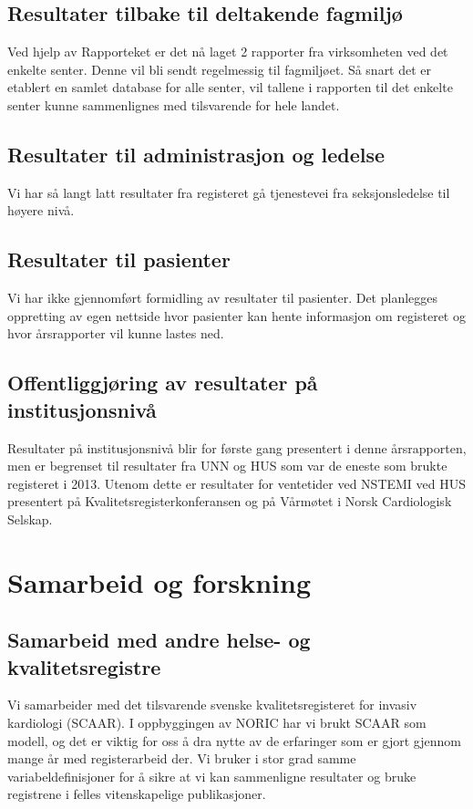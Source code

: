 \documentclass[norsk, a4paper]{report}
\begin{document}
\section{Resultater tilbake til deltakende fagmiljø}\label{sec:resfag}
Ved hjelp av Rapporteket er det nå laget 2 rapporter fra virksomheten ved det enkelte senter. Denne vil bli sendt regelmessig til fagmiljøet. Så snart det er etablert en samlet database for alle senter, vil tallene i rapporten til det enkelte senter kunne sammenlignes med tilsvarende for hele landet.

\section{Resultater til administrasjon og ledelse}\label{sec:resled}
Vi har så langt latt resultater fra registeret gå tjenestevei fra seksjonsledelse til høyere nivå.

\section{Resultater til pasienter}\label{sec:respas}
Vi har ikke gjennomført formidling av resultater til pasienter. Det planlegges oppretting av egen nettside hvor pasienter kan hente informasjon om registeret og hvor årsrapporter vil kunne lastes ned.

\section{Offentliggjøring av resultater på institusjonsnivå}\label{sec:off}
Resultater på institusjonsnivå blir for første gang presentert i denne årsrapporten, men er begrenset til resultater fra UNN og HUS som var de eneste som brukte registeret i 2013. Utenom dette er resultater for ventetider ved NSTEMI ved HUS presentert på Kvalitetsregisterkonferansen og på Vårmøtet i Norsk Cardiologisk Selskap.



\chapter{Samarbeid og forskning}\label{cha:for}


\section{Samarbeid med andre helse- og kvalitetsregistre}\label{sec:samfag}
Vi samarbeider med det tilsvarende svenske kvalitetsregisteret for invasiv kardiologi (SCAAR). I oppbyggingen av NORIC har vi brukt SCAAR som modell, og det er viktig for oss å dra nytte av de erfaringer som er gjort gjennom mange år med registerarbeid der. Vi bruker i stor grad samme variabeldefinisjoner for å sikre at vi kan sammenligne resultater og bruke registrene i felles vitenskapelige publikasjoner.
\end{document}
